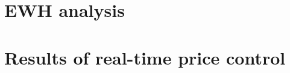 \documentclass[a4paper,11pt,twoside,onecolumn]{book}
\begin{document}
\chapter{EWH analysis}
\label{EWH_analysis}
%

\chapter{Results of real-time price control}
\label{real_time_plots}
%


\backmatter

%
%
\end{document}
